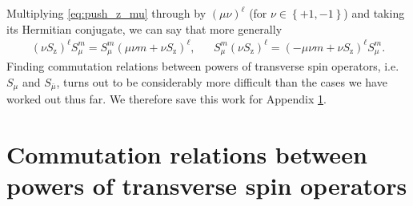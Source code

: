\documentclass[aps,11pt,notitlepage,nofootinbib,longbibliography]{revtex4-1}
\newcommand{\p}[1]{\left(#1\right)} %
\renewcommand{\set}[1]{\left\{#1\right\}} %
\newcommand{\z}{\text{z}}
\newcommand{\bmu}{{\bar\mu}}
\newcommand{\1}{\mathds{1}}
\begin{document}
Multiplying \eqref{eq:push_z_mu} through by $\p{\mu\nu}^\ell$ (for
$\nu\in\set{+1,-1}$) and taking its Hermitian conjugate, we can say
that more generally
\begin{align}
  \p{\nu S_\z}^\ell S_\mu^m
  = S_\mu^m \p{\mu\nu m+\nu S_\z}^\ell,
  &&
  S_\mu^m \p{\nu S_\z}^\ell
  = \p{-\mu\nu m+\nu S_\z}^\ell S_\mu^m.
\end{align}
Finding commutation relations between powers of transverse spin
operators, i.e.~$S_\mu$ and $S_\bmu$, turns out to be considerably
more difficult than the cases we have worked out thus far.  We
therefore save this work for Appendix \ref{sec:comm_transverse}.


\section{Commutation relations between powers of transverse spin
  operators}
\label{sec:comm_transverse}
\end{document}
